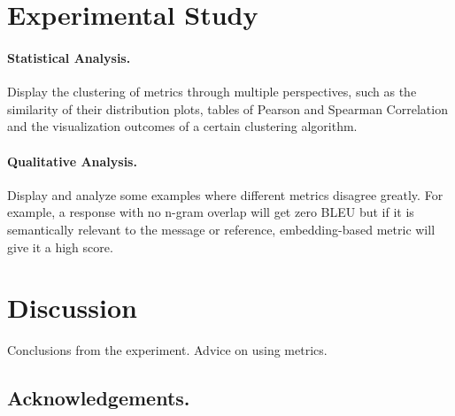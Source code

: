 \documentclass[runningheads]{llncs}
\begin{document}
\section{Experimental Study}
\paragraph{Statistical Analysis.}
Display the clustering of metrics through multiple perspectives,
such as the similarity of their distribution plots, tables of Pearson and Spearman Correlation
and the visualization outcomes of a certain clustering algorithm.

\paragraph{Qualitative Analysis.}
Display and analyze some examples where different metrics disagree greatly.
For example, a response with no n-gram overlap will get zero BLEU but if it is semantically
relevant to the message or reference, embedding-based metric will give it a high score.

\section{Discussion}
Conclusions from the experiment.
Advice on using metrics.

\subsection*{Acknowledgements.}



\end{document}
